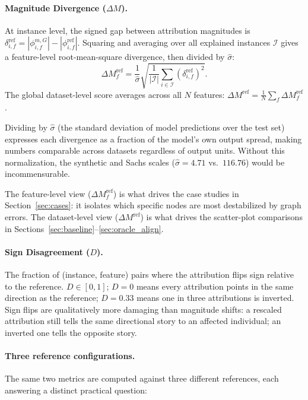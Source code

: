 \documentclass[12pt,letterpaper,twocolumn]{article}
\begin{document}
\paragraph{Magnitude Divergence ($\Delta M$).}
At instance level, the signed gap between attribution magnitudes is
$\delta^{\mathrm{ref}}_{i,f} = |\phi^{m,G}_{i,f}| - |\phi^{\mathrm{ref}}_{i,f}|$.
Squaring and averaging over all explained instances $\mathcal{I}$ gives a
feature-level root-mean-square divergence, then divided by $\hat{\sigma}$:
\begin{equation}
  \Delta M^{\mathrm{ref}}_f =
  \frac{1}{\hat{\sigma}}\sqrt{\frac{1}{|\mathcal{I}|}
  \sum_{i \in \mathcal{I}} \!\left(\delta^{\mathrm{ref}}_{i,f}\right)^2}.
\end{equation}
The global dataset-level score averages across all $N$ features:
$\Delta M^{\mathrm{ref}} = \frac{1}{N}\sum_f \Delta M^{\mathrm{ref}}_f$.

Dividing by $\hat{\sigma}$ (the standard deviation of model predictions over the test
set) expresses each divergence as a fraction of the model's own output spread, making
numbers comparable across datasets regardless of output units. Without this
normalization, the synthetic and Sachs scales ($\hat{\sigma} = 4.71$ vs.\ $116.76$)
would be incommensurable.

The feature-level view ($\Delta M^{\mathrm{ref}}_f$) is what drives the case studies
in Section~\ref{sec:cases}: it isolates which specific nodes are most destabilized by
graph errors. The dataset-level view ($\Delta M^{\mathrm{ref}}$) is what drives the
scatter-plot comparisons in Sections~\ref{sec:baseline}--\ref{sec:oracle_align}.

\paragraph{Sign Disagreement ($D$).}
The fraction of (instance, feature) pairs where the attribution flips sign relative to
the reference. $D \in [0, 1]$; $D = 0$ means every attribution points in the same
direction as the reference; $D = 0.33$ means one in three attributions is inverted.
Sign flips are qualitatively more damaging than magnitude shifts: a rescaled attribution
still tells the same directional story to an affected individual; an inverted one tells
the opposite story.

\paragraph{Three reference configurations.}
The same two metrics are computed against three different references, each answering a
distinct practical question:
\end{document}
